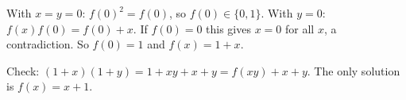 With $x=y=0$: $f(0)^2=f(0)$, so $f(0)\in\{0,1\}$. With $y=0$: $f(x)f(0)=f(0)+x$. If $f(0)=0$ this gives $x=0$ for all $x$, a contradiction. So $f(0)=1$ and $f(x)=1+x$.

Check: $(1+x)(1+y)=1+xy+x+y=f(xy)+x+y$. The only solution is $\boxed{f(x)=x+1}$.
